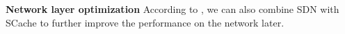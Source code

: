 \textbf{Network layer optimization} 
According to \cite{qin2017bandwidth, huang2018survey}, we can also combine SDN with SCache to further improve the performance on the network later.